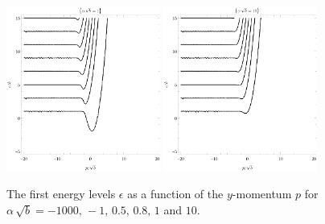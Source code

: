\begin{figure}[p]
    \\[1em]%
    \includegraphics[width=0.45\textwidth]{grafy/robin1.pdf}%
    \hspace{0.1\textwidth}%
    \includegraphics[width=0.45\textwidth]{grafy/robin10.pdf}\par
    \caption{The first energy levels $\epsilon$ as a function of the $y$-momentum $p$ for $\alpha\,\sqrt{b} = -1000, \, -1, \, 0.5, \, 0.8, \, 1$ and $10$.}
    \label{plots-robin-positive}
\end{figure}

